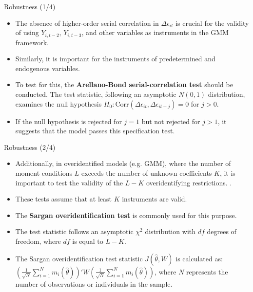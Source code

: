 \documentclass[color=usenames,dvipsnames]{beamer}
\begin{document}
\begin{frame}{Robustness (1/4)}
    \begin{itemize}
        \item The absence of higher-order serial correlation in $\Delta \epsilon_{it}$ is crucial for the validity of using $Y_{i,t-2}$, $Y_{i,t-3}$, and other variables as instruments in the GMM framework.

        \item Similarly, it is important for the instruments of predetermined and endogenous variables.

        \item To test for this, the \textbf{Arellano-Bond serial-correlation test} should be conducted. The test statistic, following an asymptotic $N(0,1)$ distribution, examines the null hypothesis $H_0: \text{Corr}(\Delta \epsilon_{it}, \Delta \epsilon_{it-j}) = 0$ for $j > 0$.

        \item If the null hypothesis is rejected for $j = 1$ but not rejected for $j > 1$, it suggests that the model passes this specification test.

    \end{itemize}
\end{frame}

\begin{frame}{Robustness (2/4)}
    \begin{itemize}
        \item Additionally, in overidentified models (e.g. GMM), where the number of moment conditions $L$ exceeds the number of unknown coefficients $K$, it is important to test the validity of the $L - K$ overidentifying restrictions. .

        \item These tests assume that at least $K$ instruments are valid.

        \item The \textbf{Sargan overidentification test} is commonly used for this purpose.

        \item The test statistic follows an asymptotic $\chi^2$ distribution with $df$ degrees of freedom, where $df$ is equal to $L - K$.

        \item The Sargan overidentification test statistic $J(\hat{\theta}, W)$ is calculated as: $\left( \frac{1}{\sqrt{N}} \sum_{i=1}^{N} m_i (\hat{\theta}) \right)' W \left( \frac{1}{\sqrt{N}} \sum_{i=1}^{N} m_i (\hat{\theta}) \right)$, where $N$ represents the number of observations or individuals in the sample.

    \end{itemize}
\end{frame}
\end{document}
